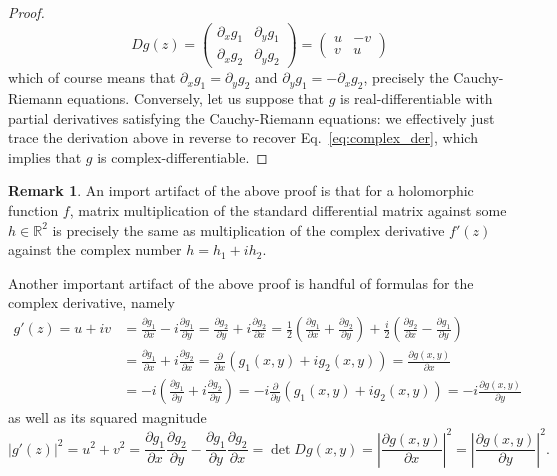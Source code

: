 \documentclass[aps,pra,showpacs,notitlepage,onecolumn,superscriptaddress,nofootinbib]{revtex4-1}
\theoremstyle{definition}
\newtheorem{remark}{Remark}[section]
\begin{document}
\begin{proof}
  \begin{equation}
    Dg(z) = \begin{pmatrix} \partial_x g_1 & \partial_y g_1 \\ \partial_x g_2 & \partial_y g_2\end{pmatrix} = \begin{pmatrix} u & -v \\ v & u \end{pmatrix}
  \end{equation}
  which of course means that $\partial_x g_1 = \partial_y g_2$ and $\partial_y g_1 = -\partial_x g_2$, precisely the Cauchy-Riemann equations. Conversely, let us suppose that
  $g$ is real-differentiable with partial derivatives satisfying the Cauchy-Riemann equations: we effectively just trace the derivation above in reverse to recover Eq.~\eqref{eq:complex_der},
  which implies that $g$ is complex-differentiable.
\end{proof}

\begin{remark}
An import artifact of the above proof is that for a holomorphic function $f$, matrix multiplication of the standard differential matrix against some $h \in \mathbb{R}^2$
is precisely the same as multiplication of the complex derivative $f'(z)$ against the complex number $h = h_1 + i h_2$.
\end{remark}

\noindent Another important artifact of the above proof is handful of formulas for the complex derivative, namely
\begin{align}
  \label{eq:comp}
  g'(z) = u + iv &= \frac{\partial g_1}{\partial x} - i \frac{\partial g_1}{\partial y} = \frac{\partial g_2}{\partial y} + i \frac{\partial g_2}{\partial x} = \frac{1}{2} \left( \frac{\partial g_1}{\partial x} + \frac{\partial g_2}{\partial y} \right) + \frac{i}{2} \left(  \frac{\partial g_2}{\partial x} - \frac{\partial g_1}{\partial y} \right)
  \\ & =  \frac{\partial g_1}{\partial x} + i \frac{\partial g_2}{\partial x} = \frac{\partial}{\partial x} \left( g_1(x, y) + i g_2(x, y) \right) = \frac{\partial g(x, y)}{\partial x}
  \\ & =  -i \left( \frac{\partial g_1}{\partial y} + i \frac{\partial g_2}{\partial y} \right) = -i \frac{\partial}{\partial y} \left( g_1(x, y) + i g_2(x, y) \right) = -i \frac{\partial g(x, y)}{\partial y}
\end{align}
as well as its squared magnitude
\begin{equation}
  |g'(z)|^2 = u^2 + v^2 = \frac{\partial g_1}{\partial x} \frac{\partial g_2}{\partial y} - \frac{\partial g_1}{\partial y} \frac{\partial g_2}{\partial x} = \det Dg(x, y) = \left| \frac{\partial g(x, y)}{\partial x} \right|^2 =  \left| \frac{\partial g(x, y)}{\partial y} \right|^2.
\end{equation}
\end{document}
